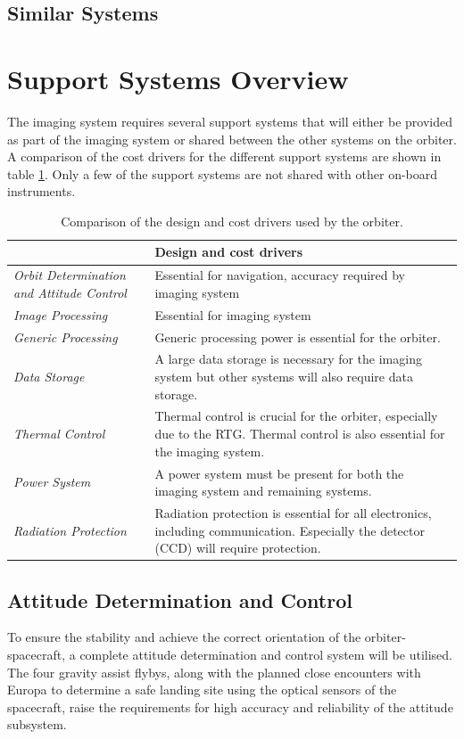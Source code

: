 \subsection{Similar Systems}
\section{Support Systems Overview}
The imaging system requires several support systems that will either be provided as part of the imaging system or shared between the other systems on the orbiter. A comparison of the cost drivers for the different support systems are shown in table \ref{tab:design_cost_driver}. Only a few of the support systems are not shared with other on-board instruments.
\begin{table}[htb]
  \centering
\begin{tabular}{p{4cm}|p{11cm}}
\toprule
      & \textbf{Design and cost drivers} \\
\midrule
\textit{Orbit Determination and Attitude Control} & Essential for navigation, accuracy required by imaging system \\
\textit{Image Processing} & Essential for imaging system \\
\textit{Generic Processing} & Generic processing power is essential for the orbiter. \\
\textit{Data Storage} & A large data storage is necessary for the imaging system but other systems will also require data storage. \\
\textit{Thermal Control} & Thermal control is crucial for the orbiter, especially due to the RTG. Thermal control is also essential for the imaging system. \\
\textit{Power System} & A power system must be present for both the imaging system and remaining systems. \\
\textit{Radiation Protection} & Radiation protection is essential for all electronics, including communication. Especially the detector (CCD) will require protection. \\
\bottomrule
\end{tabular}%
  \caption{Comparison of the design and cost drivers used by the orbiter.}
  \label{tab:design_cost_driver}%
\end{table}%
\subsection{Attitude Determination and Control}
To ensure the stability and achieve the correct orientation of the orbiter-spacecraft, a complete attitude determination and control system will be utilised. The four gravity assist flybys, along with the planned close encounters with Europa to determine a safe landing site using the optical sensors of the spacecraft, raise the requirements for high accuracy and reliability of the attitude subsystem.

